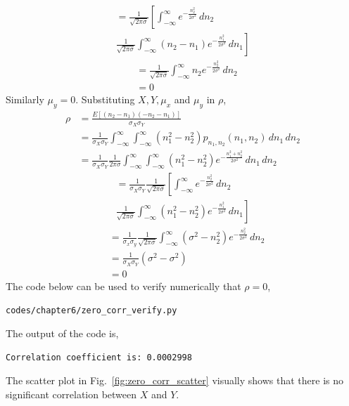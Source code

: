 \documentclass[journal,10pt,twocolumn]{IEEEtran}
\newcommand\figref{Fig.~\ref}
\providecommand{\sbrak}[1]{\ensuremath{{}\left[#1\right]}}
\providecommand{\brak}[1]{\ensuremath{\left(#1\right)}}
\begin{document}
\begin{enumerate}
\begin{enumerate}[label=(\alph{enumii})]
\begin{multline*}
	= \frac{1}{\sqrt{2\pi \sigma}}\left[ \int_{-\infty}^{\infty} e^{-\frac{n_2^2}{2\sigma^2}} \,dn_2 \right.\\
	\left. \frac{1}{\sqrt{2\pi \sigma}}\int_{-\infty}^{\infty} \brak{n_2-n_1} e^{-\frac{n_1^2}{2\sigma^2}} \,dn_1\right]
\end{multline*}
\begin{align*}
	&= \frac{1}{\sqrt{2\pi \sigma}} \int_{-\infty}^{\infty} n_2 e^{-\frac{n_2^2}{2\sigma^2}} \,dn_2\\
	&= 0
\end{align*} 
Similarly $\mu_y = 0$. Substituting $X, Y, \mu_x$ and $\mu_y$ in $\rho$,
\begin{align*}
	\rho &= \frac{E\sbrak{\brak{n_2-n_1}\brak{-n_2-n_1}}}{\sigma_X\sigma_Y}\\
	&= \frac{1}{\sigma_X \sigma_Y} \int_{-\infty}^{\infty} \int_{-\infty}^{\infty} \brak{n_1^2-n_2^2}p_{n_1,n_2}\brak{n_1,n_2}  \,dn_1  \,dn_2\\
	&= \frac{1}{\sigma_X \sigma_Y} \frac{1}{2\pi\sigma} \int_{-\infty}^{\infty} \int_{-\infty}^{\infty} \brak{n_1^2-n_2^2} e^{-\frac{n_1^2+n_2^2}{2\sigma^2}} \,dn_1  \,dn_2
\end{align*}
\begin{multline*}
	= \frac{1}{\sigma_X \sigma_Y} \frac{1}{\sqrt{2\pi \sigma}}\left[ \int_{-\infty}^{\infty} e^{-\frac{n_2^2}{2\sigma^2}} \,dn_2\right. \\
	\left. \frac{1}{\sqrt{2\pi \sigma}}\int_{-\infty}^{\infty} \brak{n_1^2-n_2^2} e^{-\frac{n_1^2}{2\sigma^2}} \,dn_1\right]
\end{multline*}
\begin{align*}
	&= \frac{1}{\sigma_x \sigma_y} \frac{1}{\sqrt{2\pi \sigma}} \int_{-\infty}^{\infty} \brak{\sigma^2-n_2^2} e^{-\frac{n_2^2}{2\sigma^2}} \,dn_2\\
	&= \frac{1}{\sigma_X \sigma_Y} \brak{\sigma^2-\sigma^2}\\
	&= 0
\end{align*}
The code below can be used to verify numerically that $\rho = 0$,
\begin{lstlisting}
codes/chapter6/zero_corr_verify.py
\end{lstlisting}
The output of the code is,
\begin{lstlisting}
Correlation coefficient is: 0.0002998	
\end{lstlisting}
The scatter plot in \figref{fig:zero_corr_scatter} visually shows that there is no significant correlation between $X$ and $Y$.

\end{enumerate}
\end{enumerate}
\end{document}

